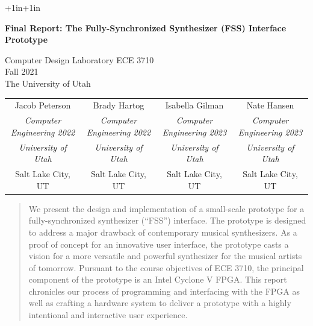 \documentclass[conference]{IEEEtran}
\begin{document}
\begin{titlepage}
\begin{adjustwidth}{+1in}{+1in}
\begin{center}
    \vspace*{6.5cm}
    \Huge
    \textbf{Final Report: The Fully-Synchronized Synthesizer (FSS) Interface Prototype}

    \vspace{1cm}
    \LARGE
    Computer Design Laboratory ECE 3710\\
    Fall 2021\\
    The University of Utah

    \vspace{1cm}

    \normalsize
    \centering
    \begin{adjustwidth}{-1.5in}{-1.5in} %
    \begin{center}
        \begin{tabular}{ c c c c }
        \centering
        Jacob Peterson & Brady Hartog & Isabella Gilman & Nate Hansen\\
        \textit{Computer Engineering 2022} & \textit{Computer Engineering 2022} & \textit{Computer Engineering 2023} & \textit{Computer Engineering 2023}\\
        \textit{University of Utah} & \textit{University of Utah} & \textit{University of Utah} & \textit{University of Utah}\\
        Salt Lake City, UT & Salt Lake City, UT & Salt Lake City, UT & Salt Lake City, UT\\
        \end{tabular}
    \end{center}
    \end{adjustwidth}
\end{center}
\end{adjustwidth}
\end{titlepage}

\begin{abstract}
We present the design and implementation of a small-scale prototype for a fully-synchronized synthesizer (“FSS”) interface. The prototype is designed to address a major drawback of contemporary musical synthesizers. As a proof of concept for an innovative user interface, the prototype casts a vision for a more versatile and powerful synthesizer for the musical artists of tomorrow. Pursuant to the course objectives of ECE 3710, the principal component of the prototype is an Intel Cyclone V FPGA. This report chronicles our process of programming and interfacing with the FPGA as well as crafting a hardware system to deliver a prototype with a highly intentional and interactive user experience.
\end{abstract}
\end{document}
